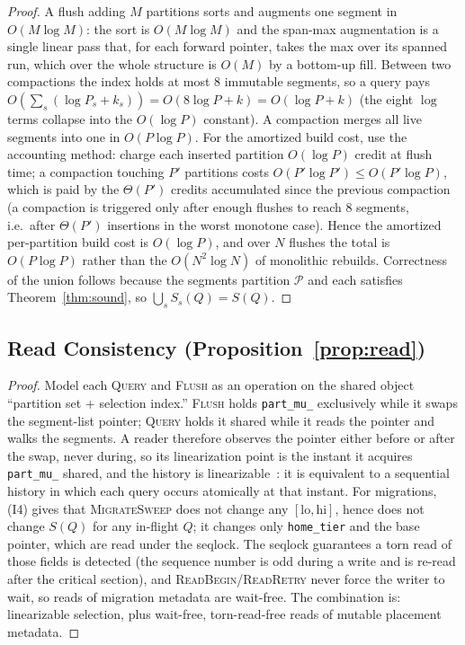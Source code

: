 \documentclass[10pt]{article}
\theoremstyle{definition}
\begin{document}
\begin{proof}
A flush adding $M$ partitions sorts and augments one segment in $O(M\log M)$: the sort is
$O(M\log M)$ and the span-max augmentation is a single linear pass that, for each forward
pointer, takes the max over its spanned run, which over the whole structure is $O(M)$ by a
bottom-up fill. Between two compactions the index holds at most $8$ immutable segments, so
a query pays $O(\sum_{s} (\log P_s + k_s)) = O(8\log P + k)=O(\log P + k)$ (the eight
$\log$ terms collapse into the $O(\log P)$ constant). A compaction merges all live segments
into one in $O(P\log P)$. For the amortized build cost, use the accounting method: charge
each inserted partition $O(\log P)$ credit at flush time; a compaction touching $P'$
partitions costs $O(P'\log P')\le O(P'\log P)$, which is paid by the $\Theta(P')$ credits
accumulated since the previous compaction (a compaction is triggered only after enough
flushes to reach $8$ segments, i.e.\ after $\Theta(P')$ insertions in the worst monotone
case). Hence the amortized per-partition build cost is $O(\log P)$, and over $N$ flushes the
total is $O(P\log P)$ rather than the $O(N^2\log N)$ of monolithic rebuilds. Correctness of
the union follows because the segments partition $\mathcal{P}$ and each satisfies
Theorem~\ref{thm:sound}, so $\bigcup_s S_s(Q)=S(Q)$.
\end{proof}

\subsection{Read Consistency (Proposition~\ref{prop:read})}

\begin{proof}
Model each \textsc{Query} and \textsc{Flush} as an operation on the shared object
``partition set + selection index.'' \textsc{Flush} holds \texttt{part\_mu\_} exclusively
while it swaps the segment-list pointer; \textsc{Query} holds it shared while it reads the
pointer and walks the segments. A reader therefore observes the pointer either before or
after the swap, never during, so its linearization point is the instant it acquires
\texttt{part\_mu\_} shared, and the history is linearizable~\citep{herlihy1990linearizability}:
it is equivalent to a sequential history in which each query occurs atomically at that
instant. For migrations, (I4) gives that \textsc{MigrateSweep} does not change any
$[\mathrm{lo},\mathrm{hi}]$, hence does not change $S(Q)$ for any in-flight $Q$; it changes
only \texttt{home\_tier} and the base pointer, which are read under the seqlock. The seqlock
guarantees a torn read of those fields is detected (the sequence number is odd during a
write and is re-read after the critical section), and \textsc{ReadBegin}/\textsc{ReadRetry}
never force the writer to wait, so reads of migration metadata are wait-free. The combination
is: linearizable selection, plus wait-free, torn-read-free reads of mutable placement
metadata.
\end{proof}
\end{document}
